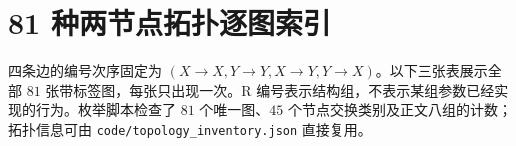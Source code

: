 \chapter{81 种两节点拓扑逐图索引}
四条边的编号次序固定为 $(X\to X,Y\to Y,X\to Y,Y\to X)$。以下三张表展示全部 $81$ 张带标签图，每张只出现一次。R 编号表示结构组，不表示某组参数已经实现的行为。枚举脚本检查了 $81$ 个唯一图、$45$ 个节点交换类别及正文八组的计数；拓扑信息可由 \texttt{code/topology\_inventory.json} 直接复用。




